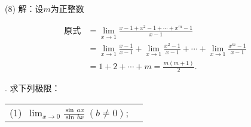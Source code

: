 \noindent (8) 解：设$m$为正整数

\begin{align}
    \text{原式} &= \lim_{x \to 1} \frac{x-1 + x^2-1 + \cdots + x^m - 1}{x-1} \\
    &= \lim_{x \to 1} \frac{x-1}{x-1} + \lim_{x \to 1} \frac{x^2-1}{x-1} + \cdots + \lim_{x \to 1} \frac{x^m-1}{x-1} \\
    &= 1 + 2 + \cdots + m = \frac{m(m+1)}{2}.
\end{align}

. 求下列极限：
\begin{table}[H]
    \centering
    \begin{tabularx}{\textwidth} {  >{\raggedright\arraybackslash}X >{\raggedright\arraybackslash}X  }
       (1)~$\displaystyle\lim_{x \to 0} \displaystyle\frac{\sin \, ax}{\sin \, bx} \; (b \neq 0)$;
      \end{tabularx}
\end{table}

